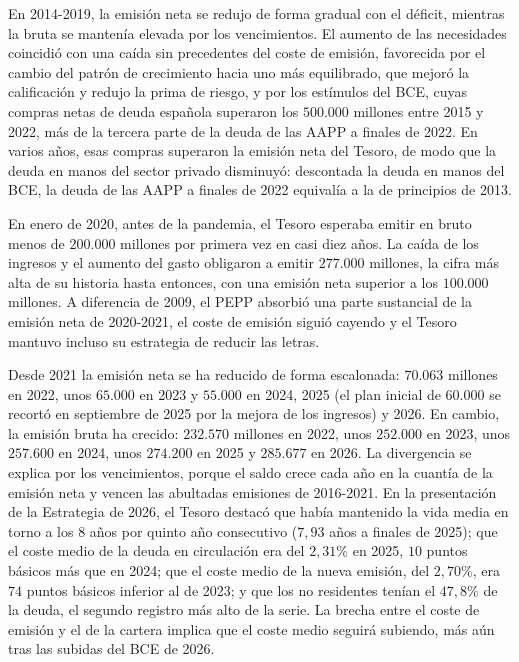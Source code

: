 \documentclass[10pt,a4paper]{article}
\begin{document}
En 2014-2019, la emisión neta se redujo de forma gradual con el déficit, mientras la bruta se mantenía elevada por los vencimientos. El aumento de las necesidades coincidió con una caída sin precedentes del coste de emisión, favorecida por el cambio del patrón de crecimiento hacia uno más equilibrado, que mejoró la calificación y redujo la prima de riesgo, y por los estímulos del BCE, cuyas compras netas de deuda española superaron los $500.000$ millones entre 2015 y 2022, más de la tercera parte de la deuda de las AAPP a finales de 2022. En varios años, esas compras superaron la emisión neta del Tesoro, de modo que la deuda en manos del sector privado disminuyó: descontada la deuda en manos del BCE, la deuda de las AAPP a finales de 2022 equivalía a la de principios de 2013.

En enero de 2020, antes de la pandemia, el Tesoro esperaba emitir en bruto menos de $200.000$ millones por primera vez en casi diez años. La caída de los ingresos y el aumento del gasto obligaron a emitir $277.000$ millones, la cifra más alta de su historia hasta entonces, con una emisión neta superior a los $100.000$ millones. A diferencia de 2009, el PEPP absorbió una parte sustancial de la emisión neta de 2020-2021, el coste de emisión siguió cayendo y el Tesoro mantuvo incluso su estrategia de reducir las letras.

Desde 2021 la emisión neta se ha reducido de forma escalonada: $70.063$ millones en 2022, unos $65.000$ en 2023 y $55.000$ en 2024, 2025 (el plan inicial de $60.000$ se recortó en septiembre de 2025 por la mejora de los ingresos) y 2026. En cambio, la emisión bruta ha crecido: $232.570$ millones en 2022, unos $252.000$ en 2023, unos $257.600$ en 2024, unos $274.200$ en 2025 y $285.677$ en 2026. La divergencia se explica por los vencimientos, porque el saldo crece cada año en la cuantía de la emisión neta y vencen las abultadas emisiones de 2016-2021. En la presentación de la Estrategia de 2026, el Tesoro destacó que había mantenido la vida media en torno a los $8$ años por quinto año consecutivo ($7,93$ años a finales de 2025); que el coste medio de la deuda en circulación era del $2,31\%$ en 2025, $10$ puntos básicos más que en 2024; que el coste medio de la nueva emisión, del $2,70\%$, era $74$ puntos básicos inferior al de 2023; y que los no residentes tenían el $47,8\%$ de la deuda, el segundo registro más alto de la serie. La brecha entre el coste de emisión y el de la cartera implica que el coste medio seguirá subiendo, más aún tras las subidas del BCE de 2026.
\end{document}
